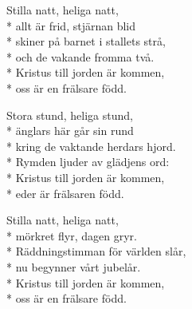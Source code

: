 \begin{SongText}
    \begin{SongVerse}
        Stilla natt, heliga natt,\\*%
        allt är frid, stjärnan blid\\*%
        skiner på barnet i stallets strå,\\*%
        och de vakande fromma två.\\*%
        Kristus till jorden är kommen,\\*%
        oss är en frälsare född.
    \end{SongVerse}
    \begin{SongVerse}
        Stora stund, heliga stund,\\*%
        änglars här går sin rund\\*%
        kring de vaktande herdars hjord.\\*%
        Rymden ljuder av glädjens ord:\\*%
        Kristus till jorden är kommen,\\*%
        eder är frälsaren född.
    \end{SongVerse}
    \begin{SongVerse}
        Stilla natt, heliga natt,\\*%
        mörkret flyr, dagen gryr.\\*%
        Räddningstimman för världen slår,\\*%
        nu begynner vårt jubelår.\\*%
        Kristus till jorden är kommen,\\*%
        oss är en frälsare född.
    \end{SongVerse}
    \begin{SongVerse}
    \end{SongVerse}
\end{SongText}